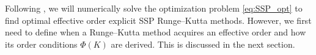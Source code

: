 Following \cite{Ketcheson2008, Ketcheson/Macdonald/Gottlieb:2009}, 
we will numerically solve the optimization problem \eqref{eq:SSP_opt} to find
optimal effective order explicit SSP Runge--Kutta methods.
However, we first need to define when a Runge--Kutta method acquires an
effective order and how its order conditions $\Phi(K)$ are derived.
This is discussed in the next section.
